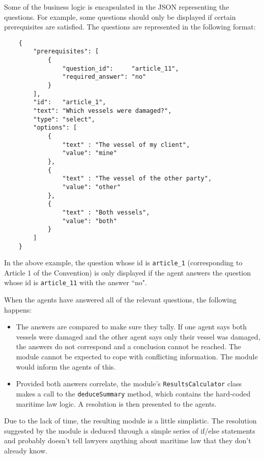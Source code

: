 Some of the business logic is encapsulated in the JSON representing the questions. For example, some questions should only be displayed if certain prerequisites are satisfied. The questions are represented in the following format:

\begin{minipage}{\textwidth}
\begin{lstlisting}
    {
        "prerequisites": [
            {
                "question_id":     "article_11",
                "required_answer": "no"
            }
        ],
        "id":   "article_1",
        "text": "Which vessels were damaged?",
        "type": "select",
        "options": [
            {
                "text" : "The vessel of my client",
                "value": "mine"
            },
            {
                "text" : "The vessel of the other party",
                "value": "other"
            },
            {
                "text" : "Both vessels",
                "value": "both"
            }
        ]
    }
\end{lstlisting}
\end{minipage}

In the above example, the question whose id is \lstinline{article_1} (corresponding to Article 1 of the Convention) is only displayed if the agent answers the question whose id is \lstinline{article_11} with the answer ``no".

When the agents have answered all of the relevant questions, the following happens:

\begin{itemize}
    \item The answers are compared to make sure they tally. If one agent says both vessels were damaged and the other agent says only their vessel was damaged, the answers do not correspond and a conclusion cannot be reached. The module cannot be expected to cope with conflicting information. The module would inform the agents of this.
    \item Provided both answers correlate, the module's \lstinline{ResultsCalculator} class makes a call to the \lstinline{deduceSummary} method, which contains the hard-coded maritime law logic. A resolution is then presented to the agents.
\end{itemize}

Due to the lack of time, the resulting module is a little simplistic. The resolution suggested by the module is deduced through a simple series of if/else statements and probably doesn't tell lawyers anything about maritime law that they don't already know.

